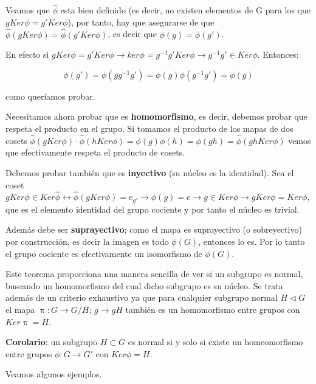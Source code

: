 Veamos que $\hat{\phi}$ esta bien definido (es decir, no existen elementos de G para los que $gKer\phi =g'Ker\phi$), por tanto, hay que asegurarse de que $\hat{\phi} (gKer\phi)=\hat{\phi}(g'Ker\phi)$, es decir que $\phi(g)=\phi (g')$.
\smallskip

En efecto si $gKer\phi =g'Ker \phi \rightarrow ker\phi=g^{-1}g'Ker\phi \rightarrow g^{-1} g' \in Ker \phi$. Entonces:

$$ \phi (g')= \phi (gg^{-1}g')=\phi (g)\phi (g^{-1}g')=\phi (g)$$

como queríamos probar.

\smallskip
Necesitamos ahora probar que es \textbf{homomorfismo}, es decir, debemos probar que respeta el producto en el grupo. Si tomamos el producto de los mapas de dos cosets $\hat{\phi} (gKer\phi)\cdot \hat{\phi} (hKer\phi)=\phi (g)\phi (h)=\phi (gh)=\hat{\phi} (ghKer\phi)$ vemos que efectivamente respeta el producto de cosets.

\smallskip
Debemos probar también que es \textbf{inyectivo} (su núcleo es la identidad). Sea el coset $gKer\phi \in Ker\hat{\phi} \leftrightarrow \hat{\phi} (gKer\phi)=e_{g'}\rightarrow \phi (g)=e \rightarrow g\in Ker \phi \rightarrow gKer\phi =Ker\phi$, que es el elemento identidad del grupo cociente y por tanto el núcleo es trivial.

\smallskip
Además debe ser \textbf{suprayectivo}; como el mapa es suprayectivo (o sobreyectivo) por construcción, es decir la imagen es todo $\phi (G)$, entonces lo es. Por lo tanto el grupo cociente es efectivamente un isomorfismo de $\phi (G)$.

\bigskip
Este teorema proporciona una manera sencilla de ver si un subgrupo es normal, buscando un homomorfismo del cual dicho subgrupo es su núcleo. Se trata además de un criterio exhaustivo ya que para cualquier subgrupo normal $H\lhd G$ el mapa $\uppi : G\rightarrow G/H$;  $g\rightarrow gH$ también es un homomorfismo entre grupos con $Ker\uppi =H$.

\smallskip
\textbf{Corolario}: un subgrupo $H\subset G$ es normal si y solo si existe un homeomorfismo entre grupos $\phi : G\rightarrow G'$ con $Ker\phi =H$.

\newpage
Veamos algunos ejemplos.

